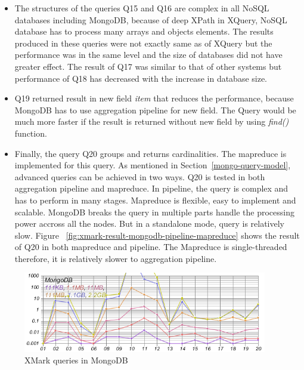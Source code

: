 \begin{itemize}
\item The structures of the queries Q15 and Q16 are complex in all NoSQL databases including MongoDB, because of deep XPath in XQuery, NoSQL database has to process many arrays and objects elements. The results produced in these queries were not exactly same as of XQuery but the performance was in the same level and the size of databases did not have greater effect. The result of Q17 was similar to that of other systems but performance of Q18 has decreased with the increase in database size. 
\item Q19 returned result in new field \textit{item} that reduces the performance, because  MongoDB has to use aggregation pipeline for new field.  The Query would be much more faster if the result is returned without new field by using \textit{find()} function.

\item Finally, the query Q20 groups and returns cardinalities. The mapreduce is implemented for this query. As mentioned in Section~\ref{mongo-query-model}, advanced queries can be achieved in two ways. Q20 is tested in both aggregation pipeline and mapreduce. In pipeline, the query is complex and has to perform in many stages. Mapreduce is flexible, easy to implement and scalable. MongoDB breaks the query in multiple parts handle the processing power accross all the nodes. But in a standalone mode, query is relatively slow. Figure ~\ref{fig:xmark-result-mongodb-pipeline-mapreduce} shows the result of Q20 in both mapreduce and pipeline. The Mapreduce is single-threaded therefore, it is relatively slower to aggregation pipeline.
\end{itemize}
\begin{figure}
	\centering
	\includegraphics[width=0.95\textwidth]{img/result/mongodb/mongodb-all}
	\caption{XMark queries in MongoDB}
	\label{fig:xmark-result-mongodb-all}
	
\end{figure}	
